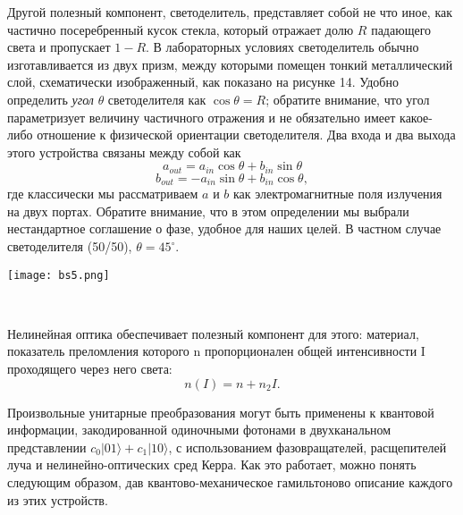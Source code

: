 \begin{multicols}{2}
{        Другой полезный компонент, светоделитель, представляет собой не что иное, как частично посеребренный
        кусок стекла, который отражает долю $R$ падающего света и пропускает $1-R$. В
        лабораторных условиях светоделитель обычно изготавливается из двух призм,
        между которыми помещен тонкий металлический слой, схематически изображенный, как показано на рисунке 14. Удобно
        определить \emph{угол} $\theta$ светоделителя как $\cos{\theta} = R$; обратите внимание, что угол параметризует
        величину частичного отражения и не обязательно имеет какое-либо отношение к
        физической ориентации светоделителя. Два входа и два выхода этого устройства
        связаны между собой как
        \begin{equation}
            a_{out}=a_{in}\cos{\theta}+b_{in}\sin{\theta}
        \end{equation}
        \begin{equation}
            b_{out}=-a_{in}\sin{\theta}+b_{in}\cos{\theta},
        \end{equation}
        где классически мы рассматриваем $a$ и $b$ как электромагнитные поля излучения на
        двух портах. Обратите внимание, что в этом определении мы выбрали нестандартное соглашение о фазе, удобное для наших целей. В частном случае светоделителя (50/50), $\theta=45^\circ$.
    }\\
    \begin{flushleft}
        \begin{minipage}{0.3\textwidth}{\texttt{[image: bs5.png]}}
        \end{minipage}\\
        \vspace{0.3cm}
    \end{flushleft}
    \normalsize{
        Нелинейная оптика обеспечивает полезный компонент для этого: материал, показатель преломления которого n пропорционален общей интенсивности I проходящего через
        него света:
        \begin{equation}
            n(I)=n+n_2I.
        \end{equation}
        
        Произвольные унитарные преобразования могут быть применены к квантовой информации, закодированной одиночными фотонами в двухканальном представлении $c_0\vert01\rangle+c_1\vert10\rangle$, с использованием фазовращателей, расщепителей луча и нелинейно-оптических сред Керра. Как это работает, можно понять следующим образом, дав квантово-механическое гамильтоново описание каждого из этих устройств.

}
\end{multicols}
